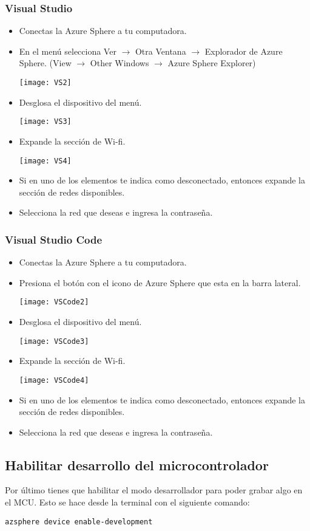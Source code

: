 \subsubsection{Visual Studio}
\begin{itemize}
	\item
	Conectas la Azure Sphere a tu computadora.
	\item 
	En el menú selecciona Ver $\rightarrow$ Otra Ventana $\rightarrow$ Explorador de Azure Sphere.
	(View $\rightarrow$ Other Windows $\rightarrow$ Azure Sphere Explorer)
	
	\texttt{[image: VS2]}
	\pagebreak
	\item 
	Desglosa el dispositivo del menú. 
	
	\texttt{[image: VS3]}
	\pagebreak
	\item 
	Expande la sección de Wi-fi.

	\texttt{[image: VS4]}
	\item 
	Si en uno de los elementos te indica como desconectado, entonces expande la sección de redes disponibles.
	\item 
	Selecciona la red que deseas e ingresa la contraseña.
\end{itemize}
\pagebreak
\subsubsection{Visual Studio Code}
\begin{itemize}
	\item
	Conectas la Azure Sphere a tu computadora.
	\item 
	Presiona el botón con el icono de Azure Sphere que esta en la barra lateral.
	
	\texttt{[image: VSCode2]}
	\pagebreak
	\item 
	Desglosa el dispositivo del menú. 

	\texttt{[image: VSCode3]}
	\item 
	Expande la sección de Wi-fi.

	\texttt{[image: VSCode4]}
	\item 
	Si en uno de los elementos te indica como desconectado, entonces expande la sección de redes disponibles.
	\item 
	Selecciona la red que deseas e ingresa la contraseña.
\end{itemize}

\subsection{Habilitar desarrollo del microcontrolador}
Por último tienes que habilitar el modo desarrollador para poder grabar algo en el MCU. Esto se hace desde la terminal con el siguiente comando:
\begin{verbatim}
azsphere device enable-development
\end{verbatim}